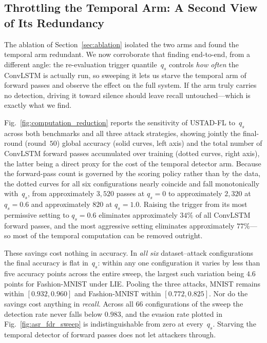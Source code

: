 \documentclass[journal]{IEEEtran}
\begin{document}
\subsection{Throttling the Temporal Arm: A Second View of Its Redundancy}
\label{sec:quantile_sweep}

The ablation of Section~\ref{sec:ablation} isolated the two arms and found the temporal arm redundant. We now corroborate that finding end-to-end, from a different angle: the re-evaluation trigger quantile~$q_s$ controls \emph{how often} the ConvLSTM is actually run, so sweeping it lets us starve the temporal arm of forward passes and observe the effect on the full system. If the arm truly carries no detection, driving it toward silence should leave recall untouched---which is exactly what we find.

Fig.~\ref{fig:computation_reduction} reports the sensitivity of USTAD-FL to~$q_s$ across both benchmarks and all three attack strategies, showing jointly the final-round (round~$50$) global accuracy (solid curves, left axis) and the total number of ConvLSTM forward passes accumulated over training (dotted curves, right axis), the latter being a direct proxy for the cost of the temporal detector arm. Because the forward-pass count is governed by the scoring policy rather than by the data, the dotted curves for all six configurations nearly coincide and fall monotonically with~$q_s$, from approximately $3{,}520$ passes at $q_s = 0$ to approximately $2{,}320$ at $q_s = 0.6$ and approximately $820$ at $q_s = 1.0$. Raising the trigger from its most permissive setting to $q_s = 0.6$ eliminates approximately $34\%$ of all ConvLSTM forward passes, and the most aggressive setting eliminates approximately $77\%$---so most of the temporal computation can be removed outright.

These savings cost nothing in accuracy. In \emph{all six} dataset--attack configurations the final accuracy is flat in~$q_s$: within any one configuration it varies by less than five accuracy points across the entire sweep, the largest such variation being $4.6$ points for Fashion-MNIST under LIE. Pooling the three attacks, MNIST remains within $[0.932, 0.960]$ and Fashion-MNIST within $[0.772, 0.825]$. Nor do the savings cost anything in \emph{recall}. Across all $66$ configurations of the sweep the detection rate never falls below $0.983$, and the evasion rate plotted in Fig.~\ref{fig:asr_fdr_sweep} is indistinguishable from zero at every~$q_s$. Starving the temporal detector of forward passes does not let attackers through.
\end{document}
